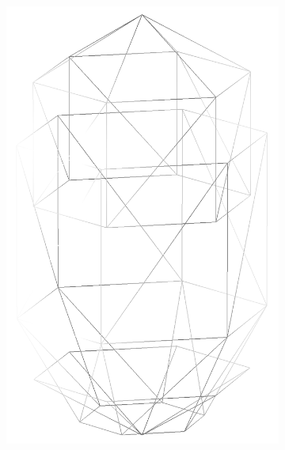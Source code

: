 \begin{figure}
\begin{center}
\begin{subfigure}{0.24\textwidth}
    \includegraphics[width=\linewidth]{assets/images/shapes/bugold/bad_mesh_low_w}
    \caption{}
    \end{subfigure}
  \end{center}
  \caption{}
  \label{fig:bad_spherocylinder_old}
\end{figure}
